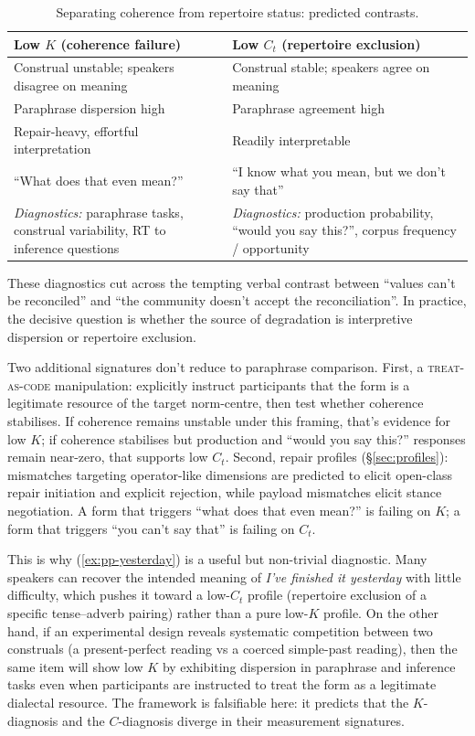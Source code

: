 \documentclass[12pt,letterpaper]{article}
\newcommand{\term}[1]{\textsc{#1}}
\newcommand{\mention}[1]{\textit{#1}}
\begin{document}
\begin{table}[H]
\centering
\footnotesize
\begin{tabular}{@{}p{5.5cm}p{5.5cm}@{}}
\toprule
\textbf{Low $K$ (coherence failure)} & \textbf{Low $C_t$ (repertoire exclusion)} \\
\midrule
Construal unstable; speakers disagree on meaning & Construal stable; speakers agree on meaning \\
Paraphrase dispersion high & Paraphrase agreement high \\
Repair-heavy, effortful interpretation & Readily interpretable \\
\enquote{What does that even mean?} & \enquote{I know what you mean, but we don't say that} \\
\addlinespace
\textit{Diagnostics:} paraphrase tasks, construal variability, RT to inference questions & \textit{Diagnostics:} production probability, \enquote{would you say this?}, corpus frequency / opportunity \\
\bottomrule
\end{tabular}
\caption{Separating coherence from repertoire status: predicted contrasts.}
\label{tab:KvsC}
\end{table}

These diagnostics cut across the tempting verbal contrast between \enquote{values can't be reconciled} and \enquote{the community doesn't accept the reconciliation}. In practice, the decisive question is whether the source of degradation is interpretive dispersion or repertoire exclusion.

Two additional signatures don't reduce to paraphrase comparison. First, a \term{treat-as-code} manipulation: explicitly instruct participants that the form is a legitimate resource of the target norm-centre, then test whether coherence stabilises. If coherence remains unstable under this framing, that's evidence for low $K$; if coherence stabilises but production and \enquote{would you say this?} responses remain near-zero, that supports low $C_t$. Second, repair profiles (\S\ref{sec:profiles}): mismatches targeting operator-like dimensions are predicted to elicit open-class repair initiation and explicit rejection, while payload mismatches elicit stance negotiation. A form that triggers \enquote{what does that even mean?} is failing on $K$; a form that triggers \enquote{you can't say that} is failing on $C_t$.

This is why (\ref{ex:pp-yesterday}) is a useful but non-trivial diagnostic. Many speakers can recover the intended meaning of \mention{I've finished it yesterday} with little difficulty, which pushes it toward a low-$C_t$ profile (repertoire exclusion of a specific tense--adverb pairing) rather than a pure low-$K$ profile. On the other hand, if an experimental design reveals systematic competition between two construals (a present-perfect reading vs a coerced simple-past reading), then the same item will show low $K$ by exhibiting dispersion in paraphrase and inference tasks even when participants are instructed to treat the form as a legitimate dialectal resource. The framework is falsifiable here: it predicts that the $K$-diagnosis and the $C$-diagnosis diverge in their measurement signatures.
\end{document}
